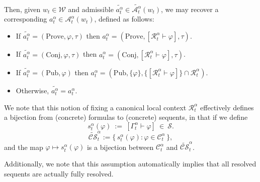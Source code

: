 \documentclass[letterpaper]{article} %
\renewcommand{\phi}{\varphi}
\newcommand{\proves}{\vdash}
\begin{document}
Then, given $w_t \in \mathcal{W}$ and admissible $\widetilde{a_t^\alpha} \in \widetilde{\mathcal{A}^\alpha_t}(w_t)$, we may recover a corresponding $a_t^\alpha \in \mathcal{A}^\alpha_t(w_t)$, defined as follows:
\begin{itemize}
    \item If $\widetilde{a_t^\alpha} = (\mathrm{Prove},\phi,\tau)$ then $a_t^\alpha = (\mathrm{Prove},[\mathcal{R}_t^\alpha \proves \phi],\tau)$.
    \item If $\widetilde{a_t^\alpha} = (\mathrm{Conj},\phi,\tau)$ then $a_t^\alpha = (\mathrm{Conj},[\mathcal{R}_t^\alpha \proves \phi],\tau)$.
    \item If $\widetilde{a_t^\alpha} = (\mathrm{Pub},\phi)$ then $a_t^\alpha = (\mathrm{Pub},\{\phi\},\{[\mathcal{R}_t^\alpha \proves \phi]\}\cap \mathcal{R}^\alpha_t)$.
    \item Otherwise, $\widetilde{a_t^\alpha} = a_t^\alpha$.
\end{itemize}


We note that this notion of fixing a canonical local context $\mathcal{R}_t^\alpha$ effectively defines a bijection from (concrete) formulas to (concrete) sequents, in that if we define
\[
s^\alpha_t(\phi)\ :=\ [\Gamma^\alpha_t \proves \phi]\ \in\ \mathcal{S}.
\]
\[
\widetilde{\mathcal{CS}}^\alpha_t
:=\{\,s^\alpha_t(\phi): \phi\in\mathcal{C}^\alpha_t\,\},
\]
and the map $\phi\mapsto s^\alpha_t(\phi)$ is a bijection between $\mathcal{C}^\alpha_t$ and
$\widetilde{\mathcal{CS}}^\alpha_t$. %

Additionally, we note that this assumption automatically implies that all resolved sequents are actually fully resolved.%

\end{document}
